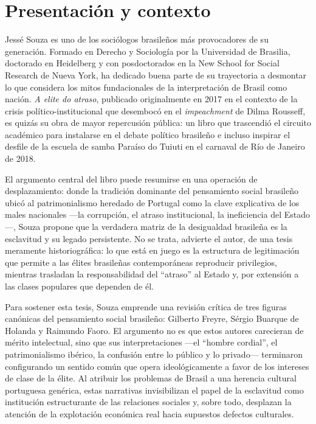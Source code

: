 \documentclass{article}
\begin{document}
\section{Presentación y contexto}
Jessé Souza es uno de los sociólogos brasileños más provocadores de su generación. Formado en Derecho y Sociología por la Universidad de Brasilia, doctorado en Heidelberg y con posdoctorados en la New School for Social Research de Nueva York, ha dedicado buena parte de su trayectoria a desmontar lo que considera los mitos fundacionales de la interpretación de Brasil como nación. \textit{A elite do atraso}, publicado originalmente en 2017 en el contexto de la crisis político-institucional que desembocó en el \textit{impeachment} de Dilma Rousseff, es quizás su obra de mayor repercusión pública: un libro que trascendió el circuito académico para instalarse en el debate político brasileño e incluso inspirar el desfile de la escuela de samba Paraíso do Tuiuti en el carnaval de Río de Janeiro de 2018.

El argumento central del libro puede resumirse en una operación de desplazamiento: donde la tradición dominante del pensamiento social brasileño ubicó al patrimonialismo heredado de Portugal como la clave explicativa de los males nacionales —la corrupción, el atraso institucional, la ineficiencia del Estado—, Souza propone que la verdadera matriz de la desigualdad brasileña es la esclavitud y su legado persistente. No se trata, advierte el autor, de una tesis meramente historiográfica: lo que está en juego es la estructura de legitimación que permite a las élites brasileñas contemporáneas reproducir privilegios, mientras trasladan la responsabilidad del “atraso” al Estado y, por extensión a las clases populares que dependen de él.

Para sostener esta tesis, Souza emprende una revisión crítica de tres figuras canónicas del pensamiento social brasileño: Gilberto Freyre, Sérgio Buarque de Holanda y Raimundo Faoro. El argumento no es que estos autores carecieran de mérito intelectual, sino que sus interpretaciones —el “hombre cordial”, el patrimonialismo ibérico, la confusión entre lo público y lo privado— terminaron configurando un sentido común que opera ideológicamente a favor de los intereses de clase de la élite. Al atribuir los problemas de Brasil a una herencia cultural portuguesa genérica, estas narrativas invisibilizan el papel de la esclavitud como institución estructurante de las relaciones sociales y, sobre todo, desplazan la atención de la explotación económica real hacia supuestos defectos culturales.
\end{document}
